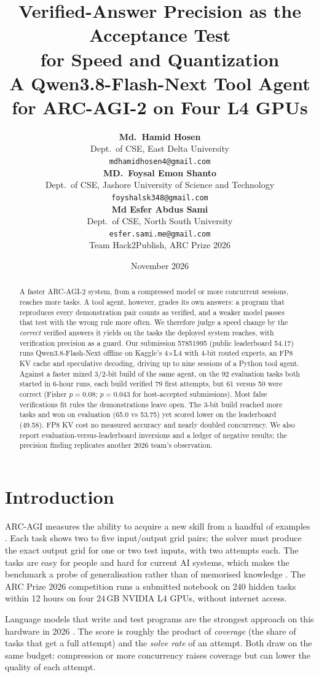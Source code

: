 \documentclass[11pt]{article}
\title{Verified-Answer Precision as the Acceptance Test\\ for Speed and Quantization\\[6pt]
\large A Qwen3.8-Flash-Next Tool Agent for ARC-AGI-2 on Four L4 GPUs}
\author{\textbf{Md.\ Hamid Hosen}\\
Dept.\ of CSE, East Delta University\\
\texttt{mdhamidhosen4@gmail.com}\\[8pt]
\textbf{MD.\ Foysal Emon Shanto}\\
Dept.\ of CSE, Jashore University of Science and Technology\\
\texttt{foyshalsk348@gmail.com}\\[8pt]
\textbf{Md Esfer Abdus Sami}\\
Dept.\ of CSE, North South University\\
\texttt{esfer.sami.me@gmail.com}\\[10pt]
\small Team Hack2Publish, ARC Prize 2026}
\date{November 2026}
\begin{document}
\maketitle

\begin{abstract}
A faster ARC-AGI-2 system, from a compressed model or more concurrent sessions, reaches more tasks. A tool agent, however, grades its own answers: a program that reproduces every demonstration pair counts as verified, and a weaker model passes that test with the wrong rule more often. We therefore judge a speed change by the \emph{correct} verified answers it yields on the tasks the deployed system reaches, with verification precision as a guard.
Our submission 57851995 (public leaderboard 54.17) runs Qwen3.8-Flash-Next offline on Kaggle's 4$\times$L4 with 4-bit routed experts, an FP8 KV cache and speculative decoding, driving up to nine sessions of a Python tool agent.
Against a faster mixed 3/2-bit build of the same agent, on the 92 evaluation tasks both started in 6-hour runs, each build verified 79 first attempts, but 61 versus 50 were correct (Fisher $p=0.08$; $p=0.043$ for host-accepted submissions). Most false verifications fit rules the demonstrations leave open. The 3-bit build reached more tasks and won on evaluation (65.0 vs 53.75) yet scored lower on the leaderboard (49.58). FP8 KV cost no measured accuracy and nearly doubled concurrency.
We also report evaluation-versus-leaderboard inversions and a ledger of negative results; the precision finding replicates another 2026 team's observation.
\end{abstract}
\clearpage

\section{Introduction}
ARC-AGI measures the ability to acquire a new skill from a handful of examples \cite{chollet2019,arcagi2}. Each task shows two to five input/output grid pairs; the solver must produce the exact output grid for one or two test inputs, with two attempts each. The tasks are easy for people and hard for current AI systems, which makes the benchmark a probe of generalisation rather than of memorised knowledge \cite{arctr2025}.
The ARC Prize 2026 competition runs a submitted notebook on 240 hidden tasks within 12 hours on four 24\,GB NVIDIA L4 GPUs, without internet access.

Language models that write and test programs are the strongest approach on this hardware in 2026 \cite{greenblatt2024,pivotools2026,notnitsuj2026}. The score is roughly the product of \emph{coverage} (the share of tasks that get a full attempt) and the \emph{solve rate} of an attempt. Both draw on the same budget: compression or more concurrency raises coverage but can lower the quality of each attempt.
\end{document}
